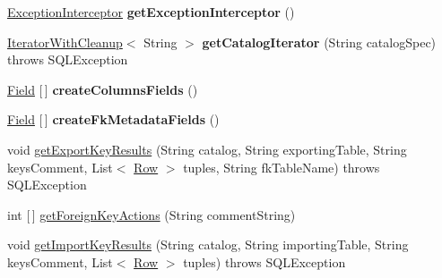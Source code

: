 \begin{DoxyCompactItemize}
\item 
\mbox{\label{classcom_1_1mysql_1_1cj_1_1jdbc_1_1_database_meta_data_a099b29ac36f3fc4040a843f2e1ca5b46}} 
\mbox{\hyperlink{interfacecom_1_1mysql_1_1cj_1_1exceptions_1_1_exception_interceptor}{Exception\+Interceptor}} {\bfseries get\+Exception\+Interceptor} ()
\item 
\mbox{\label{classcom_1_1mysql_1_1cj_1_1jdbc_1_1_database_meta_data_a709197b5fd5dbba7b90c0f12ee9f86b8}} 
\mbox{\hyperlink{classcom_1_1mysql_1_1cj_1_1jdbc_1_1_database_meta_data_1_1_iterator_with_cleanup}{Iterator\+With\+Cleanup}}$<$ String $>$ {\bfseries get\+Catalog\+Iterator} (String catalog\+Spec)  throws S\+Q\+L\+Exception 
\item 
\mbox{\label{classcom_1_1mysql_1_1cj_1_1jdbc_1_1_database_meta_data_af031b115633d183b943a5fa3ffd6641c}} 
\mbox{\hyperlink{classcom_1_1mysql_1_1cj_1_1result_1_1_field}{Field}} \mbox{[}$\,$\mbox{]} {\bfseries create\+Columns\+Fields} ()
\item 
\mbox{\label{classcom_1_1mysql_1_1cj_1_1jdbc_1_1_database_meta_data_a6c3372eaf2f4bec096f6fb59701b55a0}} 
\mbox{\hyperlink{classcom_1_1mysql_1_1cj_1_1result_1_1_field}{Field}} \mbox{[}$\,$\mbox{]} {\bfseries create\+Fk\+Metadata\+Fields} ()
\item 
void \mbox{\hyperlink{classcom_1_1mysql_1_1cj_1_1jdbc_1_1_database_meta_data_a89f8cded7b6c04309018a414b3698a97}{get\+Export\+Key\+Results}} (String catalog, String exporting\+Table, String keys\+Comment, List$<$ \mbox{\hyperlink{interfacecom_1_1mysql_1_1cj_1_1result_1_1_row}{Row}} $>$ tuples, String fk\+Table\+Name)  throws S\+Q\+L\+Exception 
\item 
int \mbox{[}$\,$\mbox{]} \mbox{\hyperlink{classcom_1_1mysql_1_1cj_1_1jdbc_1_1_database_meta_data_a0becadcb3e84a1149a496560177d0170}{get\+Foreign\+Key\+Actions}} (String comment\+String)
\item 
void \mbox{\hyperlink{classcom_1_1mysql_1_1cj_1_1jdbc_1_1_database_meta_data_ad10a46147a3e514a235c7069c68bc0c1}{get\+Import\+Key\+Results}} (String catalog, String importing\+Table, String keys\+Comment, List$<$ \mbox{\hyperlink{interfacecom_1_1mysql_1_1cj_1_1result_1_1_row}{Row}} $>$ tuples)  throws S\+Q\+L\+Exception 

\end{DoxyCompactItemize}

